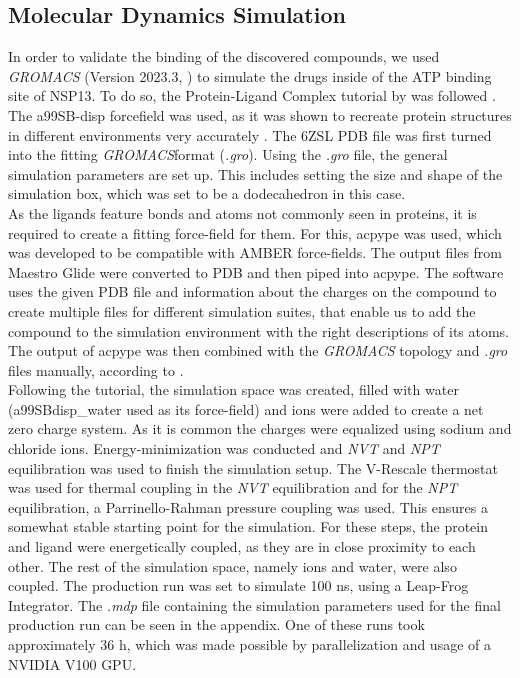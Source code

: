 \documentclass[11pt, letterpaper, titlepage]{article}
\renewcommand{\cite}{\parencite}
\begin{document}
\subsection{Molecular Dynamics Simulation}
In order to validate the binding of the discovered compounds, we used \textit{GROMACS} (Version 2023.3, \textcite{packageGROMACS}) to simulate the drugs inside of the ATP binding site of NSP13. To do so, the Protein-Ligand Complex tutorial by  was followed \cite{Lemkul2018}. The a99SB-disp forcefield was used, as it was shown to recreate protein structures in different environments very accurately \cite{Forcefield}. The 6ZSL PDB file was first turned into the fitting \textit{GROMACS}format (\textit{.gro}). Using the \textit{.gro} file, the general simulation parameters are set up. This includes setting the size and shape of the simulation box, which was set to be a dodecahedron in this case. \\ 
As the ligands feature bonds and atoms not commonly seen in proteins, it is required to create a fitting force-field for them. For this, acpype \cite{acpype} was used, which was developed to be compatible with AMBER force-fields. The output files from Maestro Glide were converted to PDB and then piped into acpype. The software uses the given PDB file and information about the charges on the compound to create multiple files for different simulation suites, that enable us to add the compound to the simulation environment with the right descriptions of its atoms.  The output of acpype was then combined with the \textit{GROMACS} topology and \textit{.gro} files manually, according to . \\
Following the tutorial, the simulation space was created, filled with water (a99SBdisp\_water used as its force-field) and ions were added to create a net zero charge system. As it is common the charges were equalized using sodium and chloride ions. Energy-minimization was conducted and \textit{NVT} and \textit{NPT} equilibration was used to finish the simulation setup. The V-Rescale thermostat was used for thermal coupling in the \textit{NVT} equilibration and for the \textit{NPT} equilibration, a Parrinello-Rahman pressure coupling was used. This ensures a somewhat stable starting point for the simulation. For these steps, the protein and ligand were energetically coupled, as they are in close proximity to each other. The rest of the simulation space, namely ions and water, were also coupled. The production run was set to simulate 100 ns, using a Leap-Frog Integrator. The \textit{.mdp} file containing the simulation parameters used for the final production run can be seen in the appendix. One of these runs took approximately  36 h, which was made possible by parallelization and usage of a NVIDIA V100 GPU. \\ 
\end{document}
